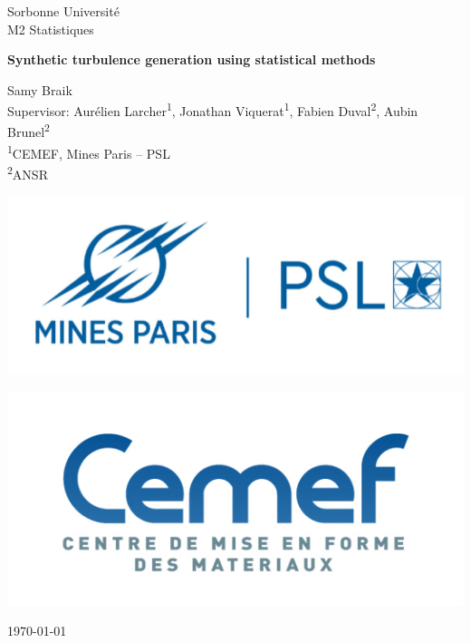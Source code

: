 \documentclass[a4paper,12pt]{article}
\theoremstyle{definition}
\begin{document}
\begin{titlepage}
    \centering
    {\Large Sorbonne Université \\ M2 Statistiques}
    
    \vspace{3cm}

    {\Huge \textbf{Synthetic turbulence generation using statistical methods}}

    \vspace{3cm}

    {\Large Samy Braik \\[0.3cm]
    Supervisor: Aurélien Larcher\textsuperscript{1}, Jonathan Viquerat\textsuperscript{1}, Fabien Duval\textsuperscript{2}, Aubin Brunel\textsuperscript{2} \\[0.3cm]
    \textsuperscript{1}CEMEF, Mines Paris – PSL \\ 
    \textsuperscript{2}ANSR}

    \vfill

    \begin{minipage}{0.45\textwidth}
        \centering
        \includegraphics[width=\textwidth]{illustrations/minesparis.png}
    \end{minipage}
    \hfill
    \begin{minipage}{0.45\textwidth}
        \centering
        \includegraphics[width=\textwidth]{illustrations/logo_cemef.jpg}
    \end{minipage}

    \vfill

    {\Large \today}
\end{titlepage}
\end{document}

